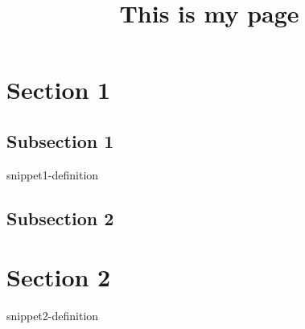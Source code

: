 \documentclass[preview]{standalone}
\begin{document}
\title{This is my page}

\genpage
\gencourse

\section{Section 1}

\subsection{Subsection 1}

\begin{snippet}{snippet1-definition}
\end{snippet}

\subsection{Subsection 2}

\section{Section 2}

\begin{snippet}{snippet2-definition}
\end{snippet}

\end{document}
